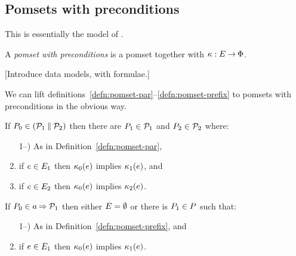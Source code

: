 \subsection{Pomsets with preconditions}

This is essentially the model of \cite{10.1145/3428262}.

\begin{definition}
  A \emph{pomset with preconditions} is
  a pomset together with $\kappa:E\mathbin\rightarrow\Phi$.
\end{definition}

[Introduce data models, with formulae.]

We can lift definitions~\ref{defn:pomset-par}--\ref{defn:pomset-prefix} to pomsets with preconditions in
the obvious way.

\begin{definition}
  \label{defn:pomset-pre-par}
  If $P_0 \in (\mathcal{P}_1\mathbin{\parallel}\mathcal{P}_2)$ then
  there are $P_1\in\mathcal{P}_1$ and $P_2\in\mathcal{P}_2$ where:
  \begin{enumerate}
    \setcounter{enumi}{\value{pomsetParCount}}
  \item[1--\thepomsetParCount)] As in Definition~\ref{defn:pomset-par},
  \item if $e\in E_1$ then $\kappa_0(e)$ implies $\kappa_1(e)$, and
  \item if $e\in E_2$ then $\kappa_0(e)$ implies $\kappa_2(e)$.
  \end{enumerate}
\end{definition}

\begin{definition}
  \label{defn:pomset-pre-prefix}
  If $P_0 \in a\mathbin{\Rightarrow}\mathcal{P}_1$ then
  either $E=\emptyset$ or there is $P_1\in P$ such that:
  \begin{enumerate}
    \setcounter{enumi}{\value{pomsetPrefixCount}}
  \item[1--\thepomsetPrefixCount)] As in Definition~\ref{defn:pomset-prefix}, and
  \item if $e\in E_1$ then $\kappa_0(e)$ implies $\kappa_1(e)$.
  \end{enumerate}
\end{definition}

